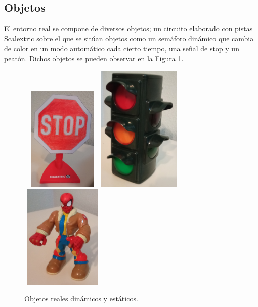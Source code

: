 \subsection{Objetos}
El entorno real se compone de diversos objetos; un circuito elaborado con pistas Scalextric sobre el que se sitúan objetos como un semáforo dinámico que cambia de color en un modo automático cada cierto tiempo, una señal de stop y un peatón. Dichos objetos se pueden observar en la Figura \ref{fig:objects}.\\

\begin{figure} [h!]
	\begin{center}
		\includegraphics[width=4cm, height=5cm]{figs/realstopsign}\hspace{0.5cm}\includegraphics[width=4cm]{figs/realtrafficlight}\hspace{0.5cm}\includegraphics[width=4cm, height=5cm]{figs/realpedestrian}
	\end{center}
	\caption{Objetos reales dinámicos y estáticos.}
	\label{fig:objects}
\end{figure}\

